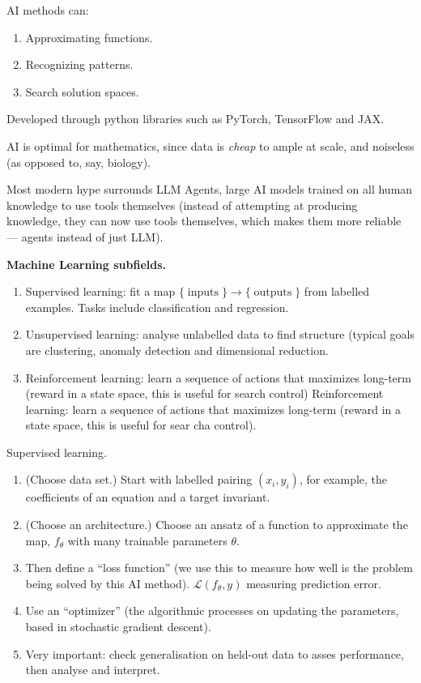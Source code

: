 AI methods can:

\begin{enumerate}
\item Approximating functions.
\item Recognizing patterns.
\item Search solution spaces.
\end{enumerate}

\noindent
Developed through python libraries such as
PyTorch, TensorFlow and JAX.

AI is optimal for mathematics, since data is
{\it cheap} to ample at scale, and noiseless
(as opposed to, say, biology).

Most modern hype surrounds LLM Agents,
large AI models trained on all human
knowledge to use tools themselves
(instead of attempting at producing
knowledge,
they can now use tools themselves, which
makes them more reliable --- agents instead
of just LLM).

\medskip\noindent
{\bf Machine Learning subfields.}
\begin{enumerate}
\item Supervised learning: fit a map
$\{\operatorname{inputs}\} \to
\{\operatorname{outputs}\}$
from labelled examples. Tasks include
classification and regression.

\item Unsupervised learning: analyse
unlabelled data to find structure (typical
goals are clustering, anomaly detection and
dimensional reduction.

\item Reinforcement learning: learn a
sequence of actions that maximizes
long-term (reward in a state space, this is
useful for search control) Reinforcement
learning: learn a sequence of actions that
maximizes long-term (reward in a state
space, this is useful for sear cha control).
\end{enumerate}

\medskip\noindent
Supervised learning.
\begin{enumerate}
\item (Choose data set.) Start with labelled pairing
$(x_i, y_i)$, for example, the coefficients
of an equation and a target invariant.

\item (Choose an architecture.) Choose an
ansatz of a function to approximate the map,
$f_{\theta}$ with many trainable parameters
$\theta$.

\item Then define a ``loss function''
(we use this to measure how well is the
problem being solved by this AI method).
$\mathcal{L}(f_{\theta},y)$ measuring prediction error.

\item Use an ``optimizer'' (the algorithmic
processes on updating the parameters,
based in stochastic gradient descent).

\item Very important: check generalisation
on held-out data to asses performance, then
analyse and interpret.
\end{enumerate}

